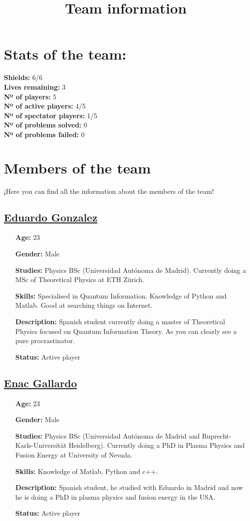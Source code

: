 \documentclass[english,11pt]{article}
\theoremstyle{definition}
\theoremstyle{plain}
\begin{document}
\title{Team information}
\maketitle
\section*{Stats of the team:}
\textbf{Shields:} 6/6 \\
\textbf{Lives remaining:} 3 \\
\textbf{Nº of players:} 5 \\
\textbf{Nº of active players:} 4/5 \\
\textbf{Nº of spectator players:} 1/5 \\
\textbf{Nº of problems solved:} 0\\ 
\textbf{Nº of problems failed:} 0 \\
\section*{Members of the team}
¡Here you can find all the information about the members of the team!  
\subsection*{\underline{Eduardo Gonzalez}}
\begin{itemize}
\item[\textbf{Age:}] 23
\item[\textbf{Gender:}] Male
\item[\textbf{Studies:}] Physics BSc (Universidad Autónoma de Madrid). Currently doing a MSc of Theoretical Physics at ETH Zürich.
\item[\textbf{Skills:}] Specialised in Quantum Information. Knowledge of Python and Matlab. Good at searching things on Internet.  
\item[\textbf{Description:}] Spanish student currently doing a master of Theoretical Physics focused on Quantum Information Theory. As you can clearly see a pure procrastinator.
\item[\textbf{Status:}] Active player
\end{itemize}


\subsection*{\underline{Enac Gallardo}}
\begin{itemize}
\item[\textbf{Age:}] 23
\item[\textbf{Gender:}] Male
\item[\textbf{Studies:}] Physics BSc (Universidad Autónoma de Madrid and Ruprecht-Karls-Universität Heidelberg). Currently doing a PhD in Plasma Physics and Fusion Energy at University of Nevada.
\item[\textbf{Skills:}] Knowledge of Matlab, Python and c++.
\item[\textbf{Description:}] Spanish student, he studied with Eduardo in Madrid and now he is doing a PhD in plasma physics and fusion energy in the USA.
\item[\textbf{Status:}] Active player
\end{itemize}
\end{document}
